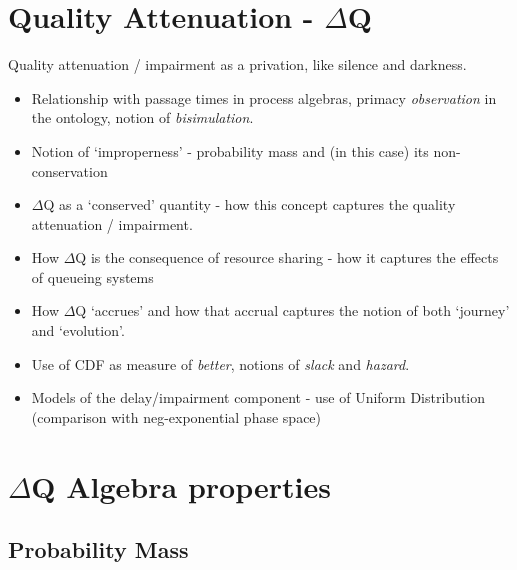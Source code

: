 \documentclass[11pt,a4paper]{article}
\begin{document}
\section{Quality Attenuation - $\Delta$Q}
Quality attenuation / impairment as a privation, like silence and darkness.
\begin{itemize}
  \item Relationship with passage times in process algebras, primacy
    \textit{observation} in the ontology, notion of
    \textit{bisimulation}.
  \item Notion of `improperness' - probability mass and (in this case)
    its non-conservation
  \item $\Delta$Q as a `conserved' quantity - how this concept
    captures the quality attenuation / impairment.
  \item How $\Delta$Q is the consequence of resource sharing - how it
    captures the effects of queueing systems
  \item How $\Delta$Q `accrues' and how that accrual captures the
    notion of both `journey' and `evolution'.
  \item Use of CDF as measure of \textit{better}, notions of
    \textit{slack} and \textit{hazard}.
  \item Models of the delay/impairment component - use of Uniform
    Distribution (comparison with neg-exponential phase space)
\end{itemize}
% 
% 
\section{$\Delta$Q Algebra properties}
\subsection{Probability Mass}
\end{document}
